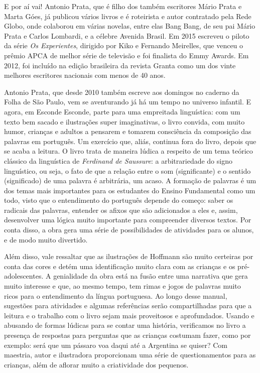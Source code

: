 \documentclass[11pt]{extarticle}
\begin{document}
E por aí vai! Antonio Prata, que é  filho dos também escritores Mário Prata e Marta Góes, já publicou vários livros e é roteirista e autor contratado pela Rede Globo, onde colaborou em várias novelas, entre elas Bang Bang, de seu pai Mário Prata e Carlos Lombardi, e a célebre Avenida Brasil. Em 2015 escreveu o piloto da série \textit{Os Experientes}, dirigido por Kiko e Fernando Meirelles, que venceu o prêmio APCA de melhor série de televisão e foi finalista do Emmy Awards. Em 2012, foi incluído na edição brasileira da revista Granta como um dos vinte melhores escritores nacionais com menos de 40 anos.

Antonio Prata, que desde 2010 também escreve aos domingos no caderno da Folha de São Paulo, vem se aventurando já há um tempo no universo infantil. E agora, em Esconde Esconde, parte para uma empreitada linguística: com um texto bem sacado e ilustrações super imaginativas, o livro convida, com muito humor, crianças e adultos a pensarem e tomarem consciência da composição das palavras em português. Um exercício que, aliás, continua fora do livro, depois que se acaba a leitura. O livro trata de maneira lúdica a respeito de um tema teórico clássico da linguística de \textit{Ferdinand de Saussure}: a arbitrariedade do signo linguístico, ou seja, o fato de que a relação entre o som (significante) e o sentido (significado) de uma palavra é arbitrária, um acaso. A formação de palavras é um dos temas mais importantes para os estudantes do Ensino Fundamental como um todo, visto que o entendimento do português depende do começo: saber os radicais das palavras, entender os afixos que são adicionados a eles e, assim, desenvolver uma lógica muito importante para compreender diversos textos. Por conta disso, a obra gera uma série de possibilidades de atividades para os alunos, e de modo muito divertido. 

Além disso, vale ressaltar que as ilustrações de Hoffmann são muito certeiras por conta das cores e detém uma identificação muito clara com as crianças e os pré-adolescentes. A genialidade da obra está na fusão entre uma narrativa que gera muito interesse e que, ao mesmo tempo, tem rimas e jogos de palavras muito ricos para o entendimento da língua portuguesa. Ao longo desse manual, sugestões para atividades e algumas referências serão compartilhadas para que a leitura e o trabalho com o livro sejam mais proveitosos e aprofundados. Usando e abusando de formas lúdicas para se contar uma história, verificamos no livro a presença de respostas para perguntas que as crianças costumam fazer, como por exemplo: será que um pássaro voa daqui até a Argentina se quiser? Com maestria, autor e ilustradora proporcionam uma série de questionamentos para as crianças, além de aflorar muito a criatividade dos pequenos. 
\end{document}
